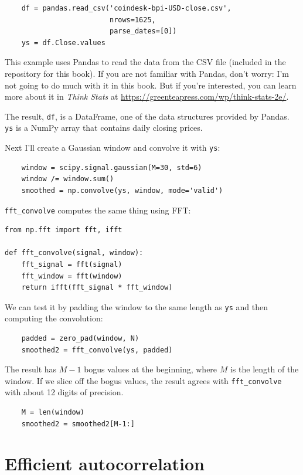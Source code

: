 \documentclass[12pt]{book}
\begin{document}
\begin{verbatim}
    df = pandas.read_csv('coindesk-bpi-USD-close.csv',
                         nrows=1625,
                         parse_dates=[0])
    ys = df.Close.values
\end{verbatim}

This example uses Pandas to read the data from the CSV file (included
in the repository for this book).  If you are not familiar with
Pandas, don't worry: I'm not going to do much with it in this book.
But if you're interested, you can learn more about it in
{\it Think Stats} at \url{https://greenteapress.com/wp/think-stats-2e/}.

The result, {\tt df}, is a DataFrame, one of the data structures
provided by Pandas.  {\tt ys} is a NumPy array that contains daily
closing prices.

Next I'll create a Gaussian window and convolve it with {\tt ys}:

\begin{verbatim}
    window = scipy.signal.gaussian(M=30, std=6)
    window /= window.sum()
    smoothed = np.convolve(ys, window, mode='valid')
\end{verbatim}

\verb"fft_convolve" computes the same thing using FFT:

\begin{verbatim}
from np.fft import fft, ifft

def fft_convolve(signal, window):
    fft_signal = fft(signal)
    fft_window = fft(window)
    return ifft(fft_signal * fft_window)
\end{verbatim}

We can test it by padding the window to the same length
as {\tt ys} and then computing the convolution:

\begin{verbatim}
    padded = zero_pad(window, N)
    smoothed2 = fft_convolve(ys, padded)
\end{verbatim}

The result has $M-1$ bogus values at the beginning, where $M$ is the
length of the window.  If we slice off the bogus values, the result
agrees with \verb"fft_convolve" with about 12 digits of precision.

\begin{verbatim}
    M = len(window)
    smoothed2 = smoothed2[M-1:]
\end{verbatim}


\section{Efficient autocorrelation}
\end{document}

